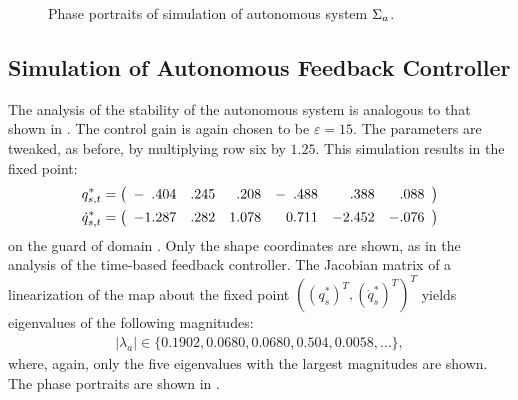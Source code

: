 \begin{figure*}[tp!]
  \centering
  \caption{Phase portraits of simulation of autonomous system $\Sigma_a$.}
  \label{fig:pp-a}
\end{figure*} 

\subsection{Simulation of Autonomous Feedback Controller}
The analysis of the stability of the autonomous system is analogous to that
shown in .
%
The control gain is again chosen to be $\varepsilon = 15$.
%
The parameters are tweaked, as before, by multiplying row six by $1.25$.
%
This simulation results in the fixed point:
%
\begin{align*}
  q_{s,t}^{*} &=
  \left(\begin{array}{r r r r r r}
      -\hphantom{1}.404 & .245 & \hphantom{1}.208 & -\hphantom{0}.488 &
      \hphantom{-2}.388 & \hphantom{-}.088
  \end{array}\right)\\
  {\dot q}_{s,t}^{*} &=
  \left(\begin{array}{r r r r r r}
    -1.287 & .282 & 1.078 & \hphantom{-}0.711 & -2.452 & -.076
  \end{array}\right)
\end{align*}
on the guard of domain {\DC}.
%
Only the shape coordinates are shown, as in the analysis of the time-based
feedback controller.
%
The Jacobian matrix of a linearization of the \Poincare{} map about the fixed
point $((q^*_s)^T, ({\dot q}^*_s)^T)^T$ yields eigenvalues of the following
magnitudes:
\begin{align*}
  |\lambda_a| \in \{0.1902, 0.0680, 0.0680, 0.504, 0.0058, \ldots\},
\end{align*}
where, again, only the five eigenvalues with the largest magnitudes are shown.
%
The phase portraits are shown in .
